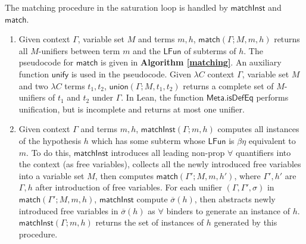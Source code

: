\noindent The matching procedure in the saturation loop is handled by $\mathsf{matchInst}$ and $\mathsf{match}$.
\begin{enumerate}
  \item Given context $\Gamma$, variable set $M$ and terms $m, h$,
    $\mathsf{match}(\Gamma; M, m, h)$ returns all $M$-unifiers between term $m$ and the $\mathsf{LFun}$ of subterms of $h$.
    The pseudocode for $\mathsf{match}$ is given in \textbf{Algorithm \ref{matching}}. An auxiliary function
    $\mathsf{unify}$ is used in the pseudocode. Given $\lambda C$ context $\Gamma$, variable set $M$
    and two $\lambda C$ terms $t_1, t_2$, $\mathsf{union}(\Gamma; M, t_1, t_2)$ returns a complete set of
    $M$-unifiers of $t_1$ and $t_2$ under $\Gamma$. In Lean, the function $\mathsf{Meta.isDefEq}$ performs
    unification, but is incomplete and returns at most one unifier.
  \item Given context $\Gamma$ and terms $m, h$,
    $\mathsf{matchInst}(\Gamma; m, h)$ computes all instances of the hypothesis $h$ which has some subterm whose
    $\mathsf{LFun}$ is $\beta\eta$ equivalent to $m$. To do this, $\mathsf{matchInst}$ introduces all leading non-prop $\forall$
    quantifiers into the context (as free variables), collects all the newly introduced free variables into a variable set $M$,
    then computes $\mathsf{match}(\Gamma'; M, m, h')$, where $\Gamma', h'$ are $\Gamma, h$ after introduction of free variables.
    For each unifier $(\Gamma, \Gamma', \sigma)$ in $\mathsf{match}(\Gamma'; M, m, h)$, $\mathsf{matchInst}$ compute $\overline{\sigma}(h)$,
    then abstracts newly introduced free variables in $\overline{\sigma}(h)$ as $\forall$ binders to generate an instance of $h$.
    $\mathsf{matchInst}(\Gamma; m, h)$ returns the set of instances of $h$ generated by this procedure. 
\end{enumerate}


